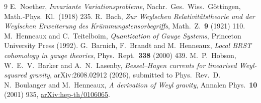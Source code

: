 \documentclass[11pt]{article}
\theoremstyle{definition}
\theoremstyle{remark}
\begin{document}
\begin{thebibliography}{9}
 E.~Noether,
  \emph{Invariante Variationsprobleme}, Nachr.\ Ges.\ Wiss.\ G\"ottingen,
  Math.-Phys.\ Kl.\ (1918) 235.
 R.~Bach,
  \emph{Zur Weylschen Relativit\"atstheorie und der Weylschen Erweiterung des
  Kr\"ummungstensorbegriffs}, Math.\ Z.\ \textbf{9} (1921) 110.
 M.~Henneaux and C.~Teitelboim,
  \emph{Quantization of Gauge Systems}, Princeton University Press (1992).
 G.~Barnich, F.~Brandt and M.~Henneaux,
  \emph{Local BRST cohomology in gauge theories}, Phys.\ Rept.\ \textbf{338}
  (2000) 439.
 M.~P.~Hobson, W.~E.~V.~Barker and
  A.~N.~Lasenby, \emph{Bessel--Hagen currents for linearised Weyl-squared
  gravity}, arXiv:2608.02912 (2026), submitted to Phys.\ Rev.\ D.
 N.~Boulanger and M.~Henneaux,
  \emph{A derivation of Weyl gravity}, Annalen Phys.\ \textbf{10} (2001) 935,
  \href{https://arxiv.org/abs/hep-th/0106065}{arXiv:hep-th/0106065}.
\end{thebibliography}
\end{document}
